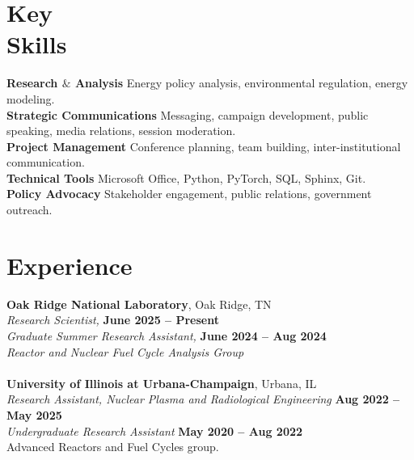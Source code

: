 \documentclass[margin,line]{resume}
\begin{document}
\begin{resume}
    \section{\mysidestyle Key\\Skills}
        \textbf{Research $\&$ Analysis} Energy policy analysis, environmental regulation, energy modeling.\vspace{1mm}\\
        \textbf{Strategic Communications} Messaging, campaign development, public speaking, media relations, session moderation.\vspace{1mm}\\
        \textbf{Project Management} Conference planning, team building, inter-institutional communication.\vspace{1mm}\\
        \textbf{Technical Tools} Microsoft Office, Python, PyTorch, SQL, Sphinx, Git.\vspace{1mm}\\
        \textbf{Policy Advocacy} Stakeholder engagement, public relations, government outreach.\vspace{1mm}
    \section{\mysidestyle Experience}
    \textbf{Oak Ridge National Laboratory}, Oak Ridge, TN\\
                \textsl{Research Scientist,} \hfill \textbf{June 2025 -- Present}\\
                \textsl{Graduate Summer Research Assistant,} \hfill \textbf{June 2024 -- Aug 2024}\\
                \textsl{Reactor and Nuclear Fuel Cycle Analysis Group}\\\\
    \textbf{University of Illinois at Urbana-Champaign}, Urbana, IL\\
                \textsl{Research Assistant, Nuclear Plasma and Radiological Engineering} \hfill \textbf{Aug 2022 -- May 2025}\\
                \textsl{Undergraduate Research Assistant} \hfill \textbf{May 2020 -- Aug 2022}\\
                Advanced Reactors and Fuel Cycles group.


\end{resume}
\end{document}
